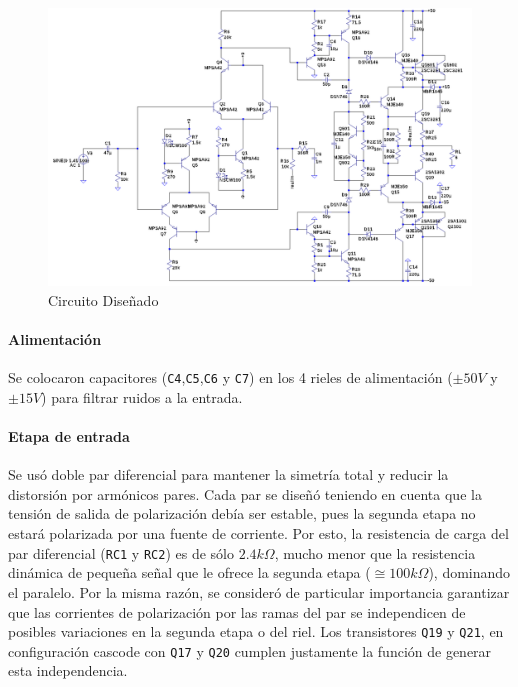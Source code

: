\documentclass[a4paper,12pt,twoside]{article}
\begin{document}
\begin{figure}[H]
\centering
\includegraphics[width=0.75\paperheight,angle=90,origin=c]{img/circuito}
\caption{Circuito Diseñado}
\label{fig:circuito} 
\end{figure}

\paragraph{Alimentación}

Se colocaron capacitores (\texttt{C4},\texttt{C5},\texttt{C6} y \texttt{C7}) en los 4 rieles de alimentación ($\pm 50V$ y $\pm 15V$) para filtrar ruidos a la entrada.

\paragraph{Etapa de entrada}

Se usó doble par diferencial para mantener la simetría total y reducir la distorsión por armónicos pares. Cada par se diseñó teniendo en cuenta que la tensión de salida de polarización debía ser estable, pues la segunda etapa no estará polarizada por una fuente de corriente. Por esto, la resistencia de carga del par diferencial (\texttt{RC1} y \texttt{RC2}) es de sólo $2.4k\Omega$, mucho menor que la resistencia dinámica de pequeña señal que le ofrece la segunda etapa ($\cong 100k\Omega$), dominando el paralelo.
Por la misma razón, se consideró de particular importancia garantizar que las corrientes de polarización por las ramas del par se independicen de posibles variaciones en la segunda etapa o del riel. Los transistores \texttt{Q19} y \texttt{Q21}, en configuración cascode con \texttt{Q17} y \texttt{Q20} cumplen justamente la función de generar esta independencia.
\end{document}
